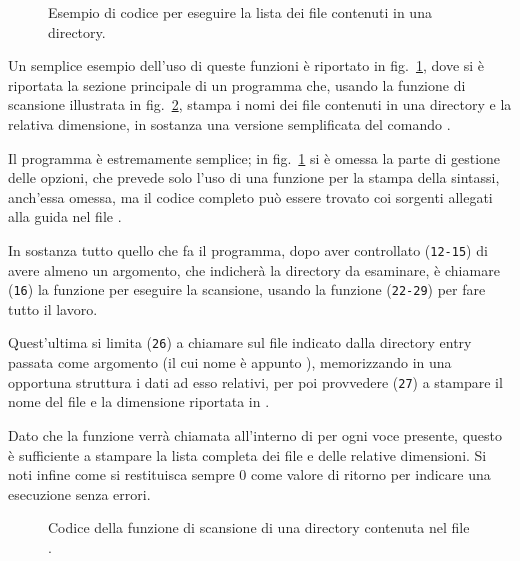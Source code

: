 \begin{figure}[!htb]
  \footnotesize \centering
  \begin{minipage}[c]{\codesamplewidth}
  \end{minipage}
  \caption{Esempio di codice per eseguire la lista dei file contenuti in una
    directory.} 
  \label{fig:file_my_ls}
\end{figure}

Un semplice esempio dell'uso di queste funzioni è riportato in
fig.~\ref{fig:file_my_ls}, dove si è riportata la sezione principale di un
programma che, usando la funzione di scansione illustrata in
fig.~\ref{fig:file_dirscan}, stampa i nomi dei file contenuti in una directory
e la relativa dimensione, in sostanza una versione semplificata del comando
.

Il programma è estremamente semplice; in fig.~\ref{fig:file_my_ls} si è omessa
la parte di gestione delle opzioni, che prevede solo l'uso di una funzione per
la stampa della sintassi, anch'essa omessa, ma il codice completo può essere
trovato coi sorgenti allegati alla guida nel file .

In sostanza tutto quello che fa il programma, dopo aver controllato
(\texttt{\small 12-15}) di avere almeno un argomento, che indicherà la
directory da esaminare, è chiamare (\texttt{\small 16}) la funzione
 per eseguire la scansione, usando la funzione 
(\texttt{\small 22-29}) per fare tutto il lavoro.

Quest'ultima si limita (\texttt{\small 26}) a chiamare  sul file
indicato dalla directory entry passata come argomento (il cui nome è appunto
), memorizzando in una opportuna struttura  i
dati ad esso relativi, per poi provvedere (\texttt{\small 27}) a stampare il
nome del file e la dimensione riportata in .

Dato che la funzione verrà chiamata all'interno di  per ogni
voce presente, questo è sufficiente a stampare la lista completa dei file e
delle relative dimensioni. Si noti infine come si restituisca sempre 0 come
valore di ritorno per indicare una esecuzione senza errori.

\begin{figure}[!htb]
  \footnotesize \centering
  \begin{minipage}[c]{\codesamplewidth}
  \end{minipage}
  \caption{Codice della funzione di scansione di una directory contenuta nel
    file .} 
  \label{fig:file_dirscan}
\end{figure}

